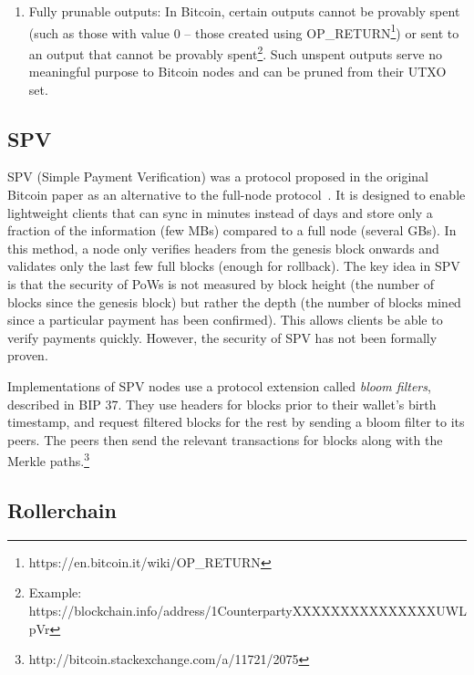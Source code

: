 \documentclass[]{report}   %
\begin{document}
\begin{enumerate}
	\item Fully prunable outputs: In Bitcoin, certain outputs cannot be provably spent (such as those with value 0 -- those created using OP\_RETURN\footnote{https://en.bitcoin.it/wiki/OP\_RETURN}) or sent to an output that cannot be provably spent\footnote{Example: https://blockchain.info/address/1CounterpartyXXXXXXXXXXXXXXXUWLpVr}. Such unspent outputs serve no meaningful purpose to Bitcoin nodes and can be pruned from their UTXO set. 
\end{enumerate}




\subsection{SPV}

SPV (Simple Payment Verification) was a protocol proposed in the original Bitcoin paper as an alternative to the full-node protocol~\cite{Nakamoto2008}. It is designed to enable lightweight clients that can sync in minutes instead of days and store only a fraction of the information (few MBs) compared to a full node (several GBs).
In this method, a node only verifies headers from the genesis block onwards and validates only the last few full blocks (enough for rollback). The key idea in SPV is that the security of PoWs is not measured by block height (the number of blocks since the genesis block) but rather the depth (the number of blocks mined since a particular payment has been confirmed). This allows clients be able to verify payments quickly. However, the security of SPV has not been formally proven.

Implementations of SPV nodes use a protocol extension called {\em bloom filters}, described in BIP 37. They use headers for blocks prior to their wallet's birth timestamp, and request filtered blocks for the rest by sending a bloom filter to its peers. The peers then send the relevant transactions for blocks along with the Merkle paths.\footnote{http://bitcoin.stackexchange.com/a/11721/2075}

\subsection{Rollerchain}
\end{document}
